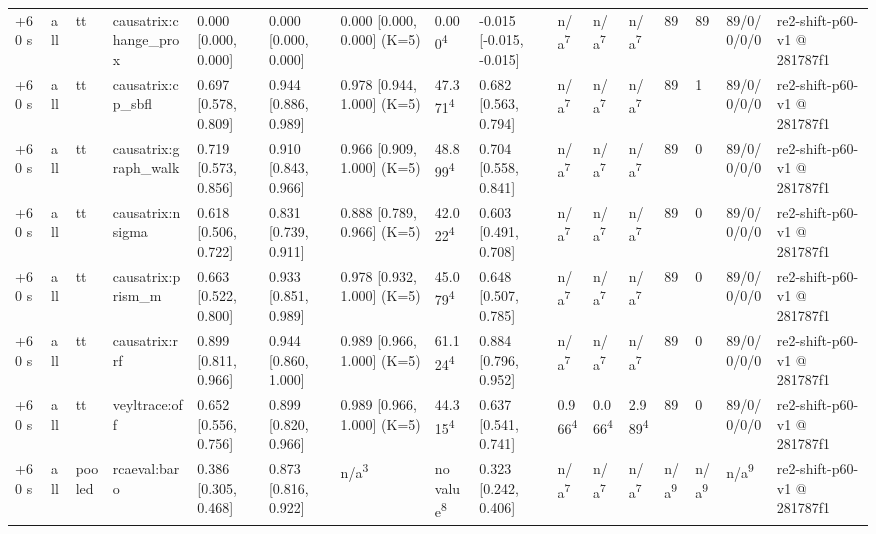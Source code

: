 \begin{table}[t]
\begin{tabular}{llllllllllllllll}
+60 s & all & tt & causatrix:change\_prox & 0.000 [0.000, 0.000] & 0.000 [0.000, 0.000] & 0.000 [0.000, 0.000] (K=5) & 0.000\textsuperscript{4} & -0.015 [-0.015, -0.015] & n/a\textsuperscript{7} & n/a\textsuperscript{7} & n/a\textsuperscript{7} & 89 & 89 & 89/0/0/0/0 & re2-shift-p60-v1 @ 281787f1 \\
+60 s & all & tt & causatrix:cp\_sbfl & 0.697 [0.578, 0.809] & 0.944 [0.886, 0.989] & 0.978 [0.944, 1.000] (K=5) & 47.371\textsuperscript{4} & 0.682 [0.563, 0.794] & n/a\textsuperscript{7} & n/a\textsuperscript{7} & n/a\textsuperscript{7} & 89 & 1 & 89/0/0/0/0 & re2-shift-p60-v1 @ 281787f1 \\
+60 s & all & tt & causatrix:graph\_walk & 0.719 [0.573, 0.856] & 0.910 [0.843, 0.966] & 0.966 [0.909, 1.000] (K=5) & 48.899\textsuperscript{4} & 0.704 [0.558, 0.841] & n/a\textsuperscript{7} & n/a\textsuperscript{7} & n/a\textsuperscript{7} & 89 & 0 & 89/0/0/0/0 & re2-shift-p60-v1 @ 281787f1 \\
+60 s & all & tt & causatrix:nsigma & 0.618 [0.506, 0.722] & 0.831 [0.739, 0.911] & 0.888 [0.789, 0.966] (K=5) & 42.022\textsuperscript{4} & 0.603 [0.491, 0.708] & n/a\textsuperscript{7} & n/a\textsuperscript{7} & n/a\textsuperscript{7} & 89 & 0 & 89/0/0/0/0 & re2-shift-p60-v1 @ 281787f1 \\
+60 s & all & tt & causatrix:prism\_m & 0.663 [0.522, 0.800] & 0.933 [0.851, 0.989] & 0.978 [0.932, 1.000] (K=5) & 45.079\textsuperscript{4} & 0.648 [0.507, 0.785] & n/a\textsuperscript{7} & n/a\textsuperscript{7} & n/a\textsuperscript{7} & 89 & 0 & 89/0/0/0/0 & re2-shift-p60-v1 @ 281787f1 \\
+60 s & all & tt & causatrix:rrf & 0.899 [0.811, 0.966] & 0.944 [0.860, 1.000] & 0.989 [0.966, 1.000] (K=5) & 61.124\textsuperscript{4} & 0.884 [0.796, 0.952] & n/a\textsuperscript{7} & n/a\textsuperscript{7} & n/a\textsuperscript{7} & 89 & 0 & 89/0/0/0/0 & re2-shift-p60-v1 @ 281787f1 \\
+60 s & all & tt & veyltrace:off & 0.652 [0.556, 0.756] & 0.899 [0.820, 0.966] & 0.989 [0.966, 1.000] (K=5) & 44.315\textsuperscript{4} & 0.637 [0.541, 0.741] & 0.966\textsuperscript{4} & 0.066\textsuperscript{4} & 2.989\textsuperscript{4} & 89 & 0 & 89/0/0/0/0 & re2-shift-p60-v1 @ 281787f1 \\
+60 s & all & pooled & rcaeval:baro & 0.386 [0.305, 0.468] & 0.873 [0.816, 0.922] & n/a\textsuperscript{3} & no value\textsuperscript{8} & 0.323 [0.242, 0.406] & n/a\textsuperscript{7} & n/a\textsuperscript{7} & n/a\textsuperscript{7} & n/a\textsuperscript{9} & n/a\textsuperscript{9} & n/a\textsuperscript{9} & re2-shift-p60-v1 @ 281787f1 \\

\end{tabular}
\end{table}
